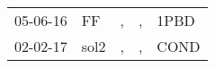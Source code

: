 \begin{supertabular}{p{0.07\textwidth}p{0.06\textwidth}p{0.02\textwidth}p{0.02\textwidth}p{0.06\textwidth}}
 05-06-16\textsuperscript{} &    FF\textsuperscript{} &  , &  , &  1PBD\textsuperscript{} \\
 02-02-17\textsuperscript{} &  sol2\textsuperscript{} &  , &  , &  COND\textsuperscript{} \\
\end{supertabular}
